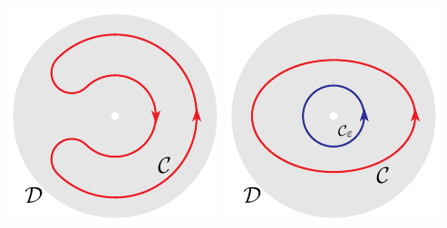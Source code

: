 \begin{efig}
\begin{center}
    \includegraphics{pDisk4}\qquad\qquad
    \includegraphics{pDisk5}
\end{center}
\end{efig}



